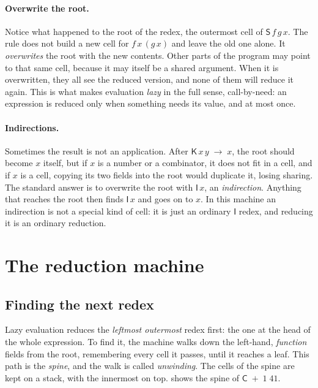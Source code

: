 \documentclass[11pt,a4paper]{article}
\newcommand{\cmb}[1]{\textsf{#1}}
\newcommand{\I}{\cmb{I}}
\newcommand{\K}{\cmb{K}}
\newcommand{\Sc}{\cmb{S}}
\newcommand{\C}{\cmb{C}}
\newcommand{\red}{\;\to\;}
\theoremstyle{definition}
\theoremstyle{plain}
\begin{document}
\paragraph{Overwrite the root.} Notice what happened to the root of the
redex, the outermost cell of $\Sc\,f\,g\,x$. The rule does not build a new
cell for $f\,x\,(g\,x)$ and leave the old one alone. It \emph{overwrites} the
root with the new contents. Other parts of the program may point to that
same cell, because it may itself be a shared argument. When it is
overwritten, they all see the reduced version, and none of them will reduce
it again. This is what makes evaluation \emph{lazy} in the full sense,
call-by-need: an expression is reduced only when something needs its value,
and at most once.

\paragraph{Indirections.} Sometimes the result is not an application. After
$\K\,x\,y \red x$, the root should become $x$ itself, but if $x$ is a number
or a combinator, it does not fit in a cell, and if $x$ is a cell, copying its
two fields into the root would duplicate it, losing sharing. The standard
answer is to overwrite the root with $\I\,x$, an \emph{indirection}. Anything
that reaches the root then finds $\I\,x$ and goes on to $x$. In this machine
an indirection is not a special kind of cell: it is just an ordinary $\I$
redex, and reducing it is an ordinary reduction.

\section{The reduction machine}\label{sec:machine}

\subsection{Finding the next redex}

Lazy evaluation reduces the \emph{leftmost outermost} redex first: the one
at the head of the whole expression. To find it, the machine walks down the
left-hand, \emph{function} fields from the root, remembering every cell it
passes, until it reaches a leaf. This path is the \emph{spine}, and the walk
is called \emph{unwinding}. The cells of the spine are kept on a stack, with
the innermost on top.  shows the spine of
$\C\;{+}\;1\;41$.
\end{document}
